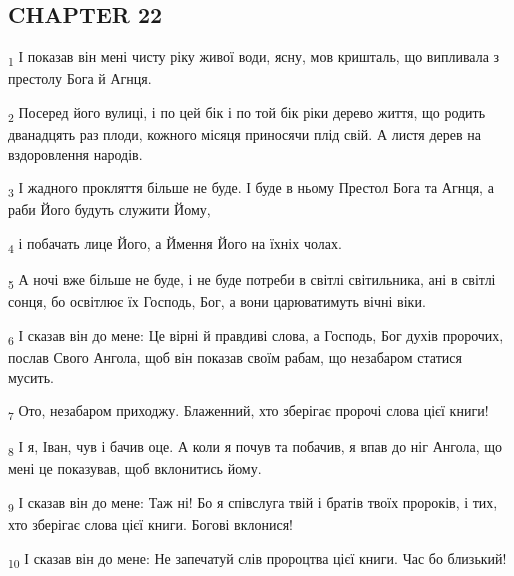 \subsection{CHAPTER 22}
\begin{tcolorbox}
\textsubscript{1} І показав він мені чисту ріку живої води, ясну, мов кришталь, що випливала з престолу Бога й Агнця.
\end{tcolorbox}
\begin{tcolorbox}
\textsubscript{2} Посеред його вулиці, і по цей бік і по той бік ріки дерево життя, що родить дванадцять раз плоди, кожного місяця приносячи плід свій. А листя дерев на вздоровлення народів.
\end{tcolorbox}
\begin{tcolorbox}
\textsubscript{3} І жадного прокляття більше не буде. І буде в ньому Престол Бога та Агнця, а раби Його будуть служити Йому,
\end{tcolorbox}
\begin{tcolorbox}
\textsubscript{4} і побачать лице Його, а Ймення Його на їхніх чолах.
\end{tcolorbox}
\begin{tcolorbox}
\textsubscript{5} А ночі вже більше не буде, і не буде потреби в світлі світильника, ані в світлі сонця, бо освітлює їх Господь, Бог, а вони царюватимуть вічні віки.
\end{tcolorbox}
\begin{tcolorbox}
\textsubscript{6} І сказав він до мене: Це вірні й правдиві слова, а Господь, Бог духів пророчих, послав Свого Ангола, щоб він показав своїм рабам, що незабаром статися мусить.
\end{tcolorbox}
\begin{tcolorbox}
\textsubscript{7} Ото, незабаром приходжу. Блаженний, хто зберігає пророчі слова цієї книги!
\end{tcolorbox}
\begin{tcolorbox}
\textsubscript{8} І я, Іван, чув і бачив оце. А коли я почув та побачив, я впав до ніг Ангола, що мені це показував, щоб вклонитись йому.
\end{tcolorbox}
\begin{tcolorbox}
\textsubscript{9} І сказав він до мене: Таж ні! Бо я співслуга твій і братів твоїх пророків, і тих, хто зберігає слова цієї книги. Богові вклонися!
\end{tcolorbox}
\begin{tcolorbox}
\textsubscript{10} І сказав він до мене: Не запечатуй слів пророцтва цієї книги. Час бо близький!
\end{tcolorbox}
